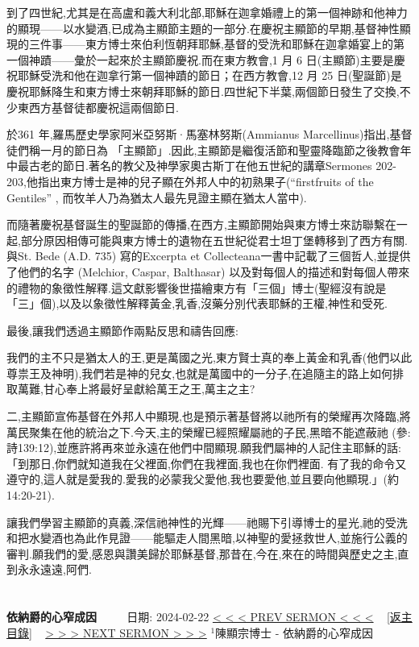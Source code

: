 \documentclass{book}
\begin{document}
到了四世紀,尤其是在高盧和義大利北部,耶穌在迦拿婚禮上的第一個神跡和他神力的顯現——以水變酒,已成為主顯節主題的一部分.在慶祝主顯節的早期,基督神性顯現的三件事——東方博士來伯利恆朝拜耶穌,基督的受洗和耶穌在迦拿婚宴上的第一個神蹟——彙於一起來於主顯節慶祝.而在東方教會,1 月 6 日(主顯節)主要是慶祝耶穌受洗和他在迦拿行第一個神蹟的節日；在西方教會,12 月 25 日(聖誕節)是慶祝耶穌降生和東方博士來朝拜耶穌的節日.四世紀下半葉,兩個節日發生了交換,不少東西方基督徒都慶祝這兩個節日.

於361 年,羅馬歷史學家阿米亞努斯·馬塞林努斯(Ammianus Marcellinus)指出,基督徒們稱一月的節日為 「主顯節」.因此,主顯節是繼復活節和聖靈降臨節之後教會年中最古老的節日.著名的教父及神學家奧古斯丁在他五世紀的講章Sermones 202-203,他指出東方博士是神的兒子顯在外邦人中的初熟果子(“firstfruits of the Gentiles” , 而牧羊人乃為猶太人最先見證主顯在猶太人當中).

而隨著慶祝基督誕生的聖誕節的傳播,在西方,主顯節開始與東方博士來訪聯繫在一起,部分原因相傳可能與東方博士的遺物在五世紀從君士坦丁堡轉移到了西方有關.與St. Bede (A.D. 735) 寫的Excerpta et Collecteana一書中記載了三個哲人,並提供了他們的名字 (Melchior, Caspar, Balthasar) 以及對每個人的描述和對每個人帶來的禮物的象徵性解釋.這文獻影響後世描繪東方有「三個」博士(聖經沒有說是「三」個),以及以象徵性解釋黃金,乳香,沒藥分別代表耶穌的王權,神性和受死.

最後,讓我們透過主顯節作兩點反思和禱告回應:

我們的主不只是猶太人的王,更是萬國之光,東方賢士真的奉上黃金和乳香(他們以此尊祟王及神明),我們若是神的兒女,也就是萬國中的一分子,在追隨主的路上如何排取萬難,甘心奉上將最好呈獻給萬王之王,萬主之主?

二,主顯節宣佈基督在外邦人中顯現,也是預示著基督將以祂所有的榮耀再次降臨,將萬民聚集在他的統治之下.今天,主的榮耀已經照耀屬祂的子民,黑暗不能遮蔽祂 (參:詩139:12),並應許將再來並永遠在他們中間顯現.願我們屬神的人記住主耶穌的話:「到那日,你們就知道我在父裡面,你們在我裡面,我也在你們裡面. 有了我的命令又遵守的,這人就是愛我的.愛我的必蒙我父愛他,我也要愛他,並且要向他顯現.」(約14:20-21).

讓我們學習主顯節的真義,深信祂神性的光輝——祂賜下引導博士的星光,祂的受洗和把水變酒也為此作見證——能驅走人間黑暗,以神聖的愛拯救世人,並施行公義的審判.願我們的愛,感恩與讚美歸於耶穌基督,那昔在,今在,來在的時間與歷史之主,直到永永遠遠,阿們.
\newpage



\section{}
\label{sec:9}
\textbf{依納爵的心窄成因}
\newline
\newline
~~~~ 日期: 2024-02-22
\newline
\newline
\hyperref[sec:8]{\small{< < < PREV SERMON < < <}}
~
\hyperref[sec:index]{\small{[返主目錄]}}
~
\hyperref[sec:10]{\small{> > > NEXT SERMON > > >}}
\newline
\newline
$^{1}$陳顯宗博士 - 依納爵的心窄成因
\end{document}
